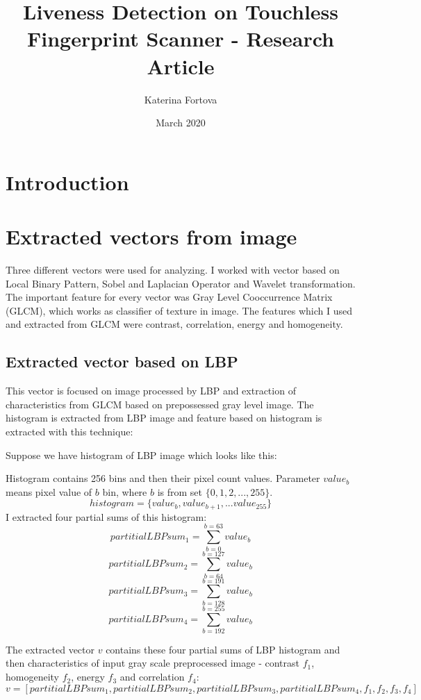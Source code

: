 \documentclass{article}
\title{Liveness Detection on Touchless Fingerprint Scanner - Research Article}
\author{Katerina Fortova}
\date{March 2020}
\begin{document}
\maketitle

\section{Introduction}

\section{Extracted vectors from image}
Three different vectors were used for analyzing. I worked with vector based on Local Binary Pattern, Sobel and Laplacian Operator and Wavelet transformation. The important feature for every vector was Gray Level Cooccurrence Matrix (GLCM), which works as classifier of texture in image. The features which I used and extracted from GLCM were contrast, correlation, energy and homogeneity. 

\subsection{Extracted vector based on LBP}
This vector is focused on image processed by LBP and extraction of characteristics from GLCM based on prepossessed gray level image. The histogram is extracted from LBP image and feature based on histogram is extracted with this technique:

Suppose we have histogram of LBP image which looks like this:

Histogram contains 256 bins and then their pixel count values. Parameter $value_b$ means pixel value of $b$ bin, where $b$ is from set $\{0,1,2,...,255\}$.
$$histogram = \{value_b, value_{b+1}, ... value_{255}\}$$
I extracted four partial sums of this histogram:
$$partitialLBPsum_1 = \sum_{b=0}^{b=63} value_b $$
$$partitialLBPsum_2 = \sum_{b=64}^{b=127} value_b $$
$$partitialLBPsum_3 = \sum_{b=128}^{b=191} value_b $$
$$partitialLBPsum_4 = \sum_{b=192}^{b=255} value_b $$

The extracted vector $v$ contains these four partial sums of LBP histogram and then characteristics of input gray scale preprocessed image - contrast $f_1$, homogeneity $f_2$, energy $f_3$ and correlation $f_4$:
$$v = [partitialLBPsum_1, partitialLBPsum_2, partitialLBPsum_3, partitialLBPsum_4, f_1, f_2, f_3, f_4]$$
\end{document}
